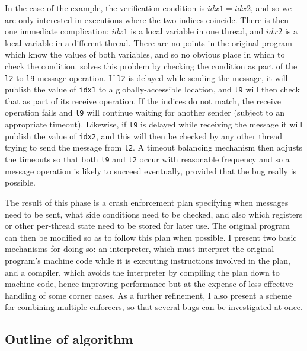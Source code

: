 In the case of the example, the verification condition is $idx1 =
idx2$, and so we are only interested in executions where the two
indices coincide.  There is then one immediate complication: $idx1$ is
a local variable in one thread, and $idx2$ is a local variable in a
different thread.  There are no points in the original program which
know the values of both variables, and so no obvious place in which to
check the condition.  {\Technique} solves this problem by checking the
condition as part of the \verb|l2| to \verb|l9| message operation.  If
\verb|l2| is delayed while sending the message, it will publish the
value of \verb|idx1| to a globally-accessible location, and \verb|l9|
will then check that as part of its receive operation.  If the indices
do not match, the receive operation fails and \verb|l9| will continue
waiting for another sender (subject to an appropriate timeout).
Likewise, if \verb|l9| is delayed while receiving the message it will
publish the value of \verb|idx2|, and this will then be checked by any
other thread trying to send the message from \verb|l2|.  A timeout
balancing mechanism then adjusts the timeouts so that both \verb|l9|
and \verb|l2| occur with reasonable frequency and so a message
operation is likely to succeed eventually, provided that the bug
really is possible.

The result of this phase is a crash enforcement plan specifying when
messages need to be sent, what side conditions need to be checked, and
also which registers or other per-thread state need to be stored for
later use.  The original program can then be modified so as to follow
this plan when possible.  I present two basic mechanisms for doing so:
an interpreter, which must interpret the original program's machine
code while it is executing instructions involved in the plan, and a
compiler, which avoids the interpreter by compiling the plan down to
machine code, hence improving performance but at the expense of less
effective handling of some corner cases.  As a further refinement, I
also present a scheme for combining multiple enforcers, so that
several bugs can be investigated at once.


\subsection{Outline of algorithm}

